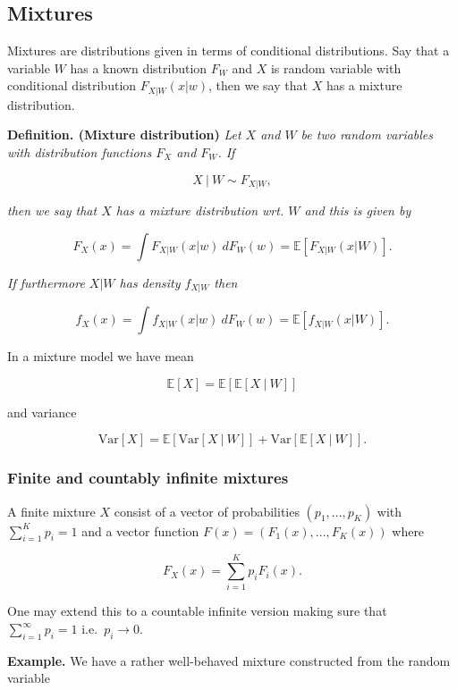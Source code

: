 \documentclass[a4paper,10pt,openany]{book}
\begin{document}
\hypertarget{mixtures}{%
\subsection{Mixtures}\label{mixtures}}

Mixtures are distributions given in terms of conditional distributions. Say that a variable \(W\) has a known distribution \(F_W\) and \(X\) is random variable with conditional distribution \(F_{X\vert W}(x\vert w)\), then we say that \(X\) has a mixture distribution.

\textbf{Definition. (Mixture distribution)} \emph{Let \(X\) and \(W\) be two random variables with distribution functions \(F_X\) and \(F_W\). If}

\[
X\ \vert\ W\sim F_{X\vert W},
\]

\emph{then we say that \(X\) has a mixture distribution wrt. \(W\) and this is given by}

\[
F_X(x)=\int F_{X\vert W}(x\vert w)\ dF_W(w)=\mathbb E[F_{X\vert W}(x\vert W)].
\]

\emph{If furthermore \(X\vert W\) has density \(f_{X\vert W}\) then}

\[
f_X(x)=\int f_{X\vert W}(x\vert w)\ dF_W(w)=\mathbb E[f_{X\vert W}(x\vert W)].
\]

In a mixture model we have mean

\[
\mathbb E[X]=\mathbb E[\mathbb E[X\ \vert\ W]]
\]

and variance

\[
\text{Var}[X]=\mathbb E[\text{Var}[X\ \vert\ W]] + \text{Var}[\mathbb E[X\ \vert\ W]].
\]

\hypertarget{finite-and-countably-infinite-mixtures}{%
\subsubsection{Finite and countably infinite mixtures}\label{finite-and-countably-infinite-mixtures}}

A finite mixture \(X\) consist of a vector of probabilities \((p_1,...,p_K)\) with \(\sum_{i=1}^K p_i=1\) and a vector function \(F(x)=(F_1(x),...,F_K(x))\) where

\[
F_X(x)=\sum_{i=1}^K p_i F_i(x).
\]

One may extend this to a countable infinite version making sure that \(\sum_{i=1}^\infty p_i=1\) i.e.~\(p_i\to 0\).

\textbf{Example.} We have a rather well-behaved mixture constructed from the random variable
\end{document}
